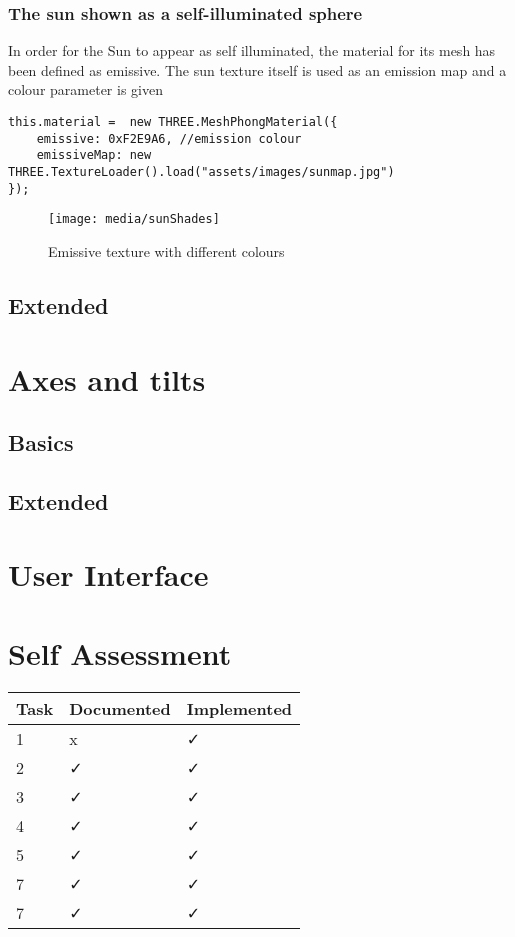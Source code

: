 \documentclass[titlepage]{article}
\begin{document}
\subsubsection{The sun shown as a self-illuminated sphere}
In order for the Sun to appear as self illuminated, the material for its mesh has been defined as emissive. The sun texture itself is used as an emission map and a colour parameter is given  
\begin{lstlisting}
this.material =  new THREE.MeshPhongMaterial({
    emissive: 0xF2E9A6, //emission colour
    emissiveMap: new THREE.TextureLoader().load("assets/images/sunmap.jpg")
});
\end{lstlisting}
\begin{figure}[h!]
                \centering
                \texttt{[image: media/sunShades]}
                \caption{Emissive texture with different colours}
                \label{fig:basic_model}
\end{figure}
\subsection{Extended}
\medskip

\section{Axes and tilts}

\subsection{Basics}

\subsection{Extended}


\section{User Interface}

\section{Self Assessment}

 \begin{tabularx}{0.8\columnwidth}{| X | X | X |}
            \hline
            Task & Documented & Implemented \\
            \hline
            1 & x & ✓ \\
            \hline
            2 & ✓ & ✓ \\
            \hline
            3 & ✓ & ✓ \\
            \hline
            4 & ✓ & ✓ \\
            \hline
            5 & ✓ & ✓ \\
            \hline
            7 & ✓ & ✓ \\
            \hline
            7 & ✓ & ✓ \\
            \hline
        \end{tabularx} \\
\end{document}
